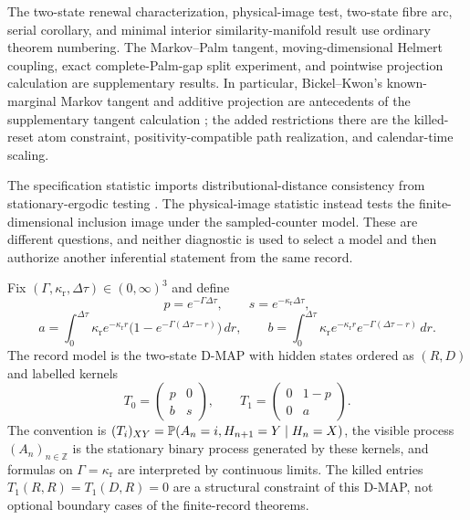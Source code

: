The two-state renewal characterization, physical-image test, two-state fibre
arc, serial corollary, and minimal interior similarity-manifold result use
ordinary theorem numbering.  The
Markov--Palm tangent, moving-dimensional Helmert coupling, exact
complete-Palm-gap split experiment, and pointwise projection calculation are
supplementary results.  In particular, Bickel--Kwon's known-marginal Markov
tangent and additive projection are antecedents of the supplementary tangent
calculation \cite{BickelKwon2001Semiparametric}; the added restrictions there
are the killed-reset atom constraint, positivity-compatible path realization,
and calendar-time scaling.

The specification statistic imports distributional-distance consistency from
stationary-ergodic testing \cite{RyabkoRyabko2010ErgodicInference,
Ryabko2012StationaryTesting}.  The physical-image statistic instead tests the
finite-dimensional inclusion image under the sampled-counter model.  These are
different questions, and neither diagnostic is used to select a model and then
authorize another inferential statement from the same record.

\begin{assumption}\label{ass:model-inference-contract-main}
Fix \((\Gamma,\kappa_{\mathrm r},\Delta\tau)\in(0,\infty)^3\) and define
\[
p=e^{-\Gamma\Delta\tau},\qquad
s=e^{-\kappa_{\mathrm r}\Delta\tau},
\]
\[
a=\int_0^{\Delta\tau}\kappa_{\mathrm r}e^{-\kappa_{\mathrm r}r}
\bigl(1-e^{-\Gamma(\Delta\tau-r)}\bigr)\,dr,\qquad
b=\int_0^{\Delta\tau}\kappa_{\mathrm r}e^{-\kappa_{\mathrm r}r}
e^{-\Gamma(\Delta\tau-r)}\,dr .
\]
The record model is the two-state D-MAP with hidden states ordered as
\((R,D)\) and labelled kernels
\[
T_0=\begin{pmatrix}p&0\\ b&s\end{pmatrix},
\qquad
T_1=\begin{pmatrix}0&1-p\\0&a\end{pmatrix}.
\]
The convention is
\((T_i)_{XY}=\mathbb{P}(A_n=i,H_{n+1}=Y\mid H_n=X)\), the visible process
\((A_n)_{n\in\mathbb Z}\) is the stationary binary process generated by these
kernels, and formulas on \(\Gamma=\kappa_{\mathrm r}\) are interpreted by
continuous limits.  The killed entries \(T_1(R,R)=T_1(D,R)=0\) are a structural
constraint of this D-MAP, not optional boundary cases of the finite-record
theorems.
\end{assumption}

